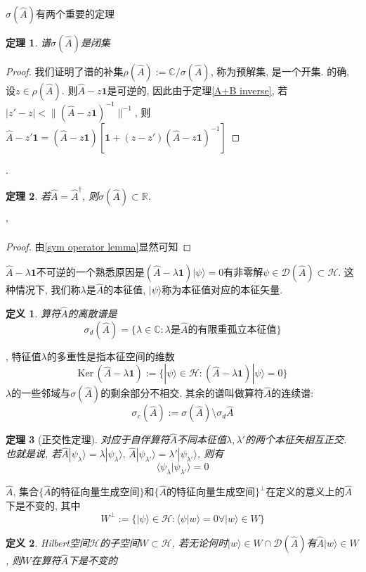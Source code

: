 \documentclass[a4paper,11pt]{book}
\newtheorem{definition}{\hspace{2em}定义}[section]
\newtheorem{theorem}{\hspace{2em}定理}[section]
\newtheorem{proof}{证明}[section]
\begin{document}
$\sigma(\hat{A})$有两个重要的定理
\begin{theorem}
  谱$\sigma(\hat{A})$是闭集
\end{theorem}
\begin{proof}
  我们证明了谱的补集$\rho(\hat{A}):=\mathbb{C}/\sigma(\hat{A})$, 称为预解集, 是一个开集. 的确, 设$z\in\rho(\hat{A})$. 则$\hat{A}-z\mathbf{1}$是可逆的, 因此由于定理\ref{A+B inverse}, 若$|z'-z|<\|(\hat{A}-z\mathbf{1})^{-1}\|^{-1}$, 则$\hat{A}-z'\mathbf{1}=(\hat{A}-z\mathbf{1})[\mathbf{1}+(z-z')(\hat{A}-z\mathbf{1})^{-1}]$
\end{proof}
.
\begin{theorem}\label{Real spectrum}
  若$\hat{A}=\hat{A}^{\dag}$, 则$\sigma(\hat{A})\subset\mathbb{R}$.
\end{theorem}'
\begin{proof}
  由\ref{sym operator lemma}显然可知
\end{proof}
$\hat{A}-\lambda\mathbf{1}$不可逆的一个熟悉原因是$(\hat{A}-\lambda\mathbf{1})|\psi\rangle=0$有非零解$\psi\in\mathcal{D}(\hat{A})\subset\mathcal{H}$. 这种情况下, 我们称$\lambda$是$\hat{A}$的本征值, $|\psi\rangle$称为本征值对应的本征矢量.
\begin{definition}
  算符$\hat{A}$的离散谱是
  \begin{equation*}
    \sigma_d(\hat{A})=\{\lambda\in\mathbb{C}:\text{$\lambda$是$\hat{A}$的有限重孤立本征值}\}
  \end{equation*}
\end{definition}
, 特征值$\lambda$的多重性是指本征空间的维数
\begin{equation*}
  \mathrm{Ker}\,(\hat{A}-\lambda\mathbf{1}):=\{|\psi\rangle\in\mathcal{H}:(\hat{A}-\lambda\mathbf{1})|\psi\rangle=0\}
\end{equation*}
$\lambda$的一些邻域与$\sigma(\hat{A})$的剩余部分不相交. 其余的谱叫做算符$\hat{A}$的连续谱:
\begin{equation*}
  \sigma_{e}(\hat{A}):=\sigma(\hat{A})\setminus\sigma_d{\hat{A}}
\end{equation*}
\begin{theorem}[正交性定理]\label{orthogonal theorem}
  对应于自伴算符$\hat{A}$不同本征值$\lambda,\lambda'$的两个本征矢相互正交. 也就是说, 若$\hat{A}|\psi_\lambda\rangle=\lambda|\psi_\lambda\rangle,\,\hat{A}|\psi_{\lambda'}\rangle=\lambda'|\psi_{\lambda'}\rangle$, 则有
  \begin{equation}\label{eigenorthogonal}
    \langle\psi_\lambda|\psi_{\lambda'}\rangle=0
  \end{equation}
\end{theorem}
$\hat{A}$, 集合$\{\hat{A}\text{的特征向量生成空间}\}$和$\{\text{$\hat{A}$的特征向量生成空间}\}^{\perp}$在定义的意义上的$\hat{A}$下是不变的, 其中
\begin{equation*}
  W^{\perp}:=\{|\psi\rangle\in\mathcal{H}:\langle\psi|w\rangle=0\forall |w\rangle\in W\}
\end{equation*}
\begin{definition}
  Hilbert空间$\mathcal{H}$的子空间$W\subset\mathcal{H}$, 若无论何时$|w\rangle\in W\cap\mathcal{D}(\hat{A})$有$\hat{A}|w\rangle\in W$, 则$W$在算符$\hat{A}$下是不变的
\end{definition}
\end{document}
